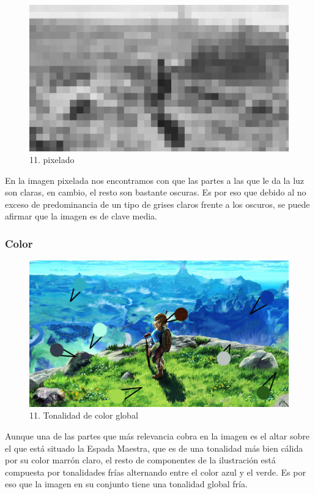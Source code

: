\documentclass[12pt]{article}
\begin{document}
      \begin{figure}[H]
      \centering
      \includegraphics[scale=0.35]{images/Carlos/15/Pixelart.jpg}
      \caption{\small 11. pixelado}
      \end{figure}
      En la imagen pixelada nos encontramos con que las partes a las que le da la luz son claras, en cambio, el resto son bastante oscuras. Es por eso que debido al no exceso de predominancia de un tipo de grises claros frente a los oscuros, se puede afirmar que la imagen es de clave media.

      \subsubsection{Color}
      \begin{figure}[H]
      \centering
      \includegraphics[scale=0.35]{images/Carlos/15/Tonalidad.jpg}
      \caption{\small 11. Tonalidad de color global}
      \end{figure}
      Aunque una de las partes que más relevancia cobra en la imagen es el altar sobre el que está situado la Espada Maestra, que es de una tonalidad más bien cálida por su color marrón claro, el resto de componentes de la ilustración está compuesta por tonalidades frías alternando entre el color azul y el verde. Es por eso que la imagen en su conjunto tiene una tonalidad global fría.
\end{document}
